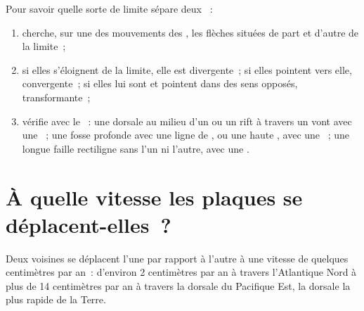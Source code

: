 \begin{method}\label{met:g7:plate-tectonics:recognise}
Pour savoir quelle sorte de limite sépare deux ~:
\begin{enumerate}
  \item cherche, sur une  des mouvements des , les flèches
        situées de part et d'autre de la limite~;
  \item si elles s'éloignent de la limite, elle est divergente~; si elles
        pointent vers elle, convergente~; si elles lui sont  et
        pointent dans des sens opposés, transformante~;
  \item vérifie avec le ~: une dorsale au milieu d'un  ou un
        rift à travers un  vont avec une ~; une
        fosse profonde avec une ligne de , ou une haute , avec une ~; une longue faille
        rectiligne sans l'un ni l'autre, avec une .
\end{enumerate}
\end{method}

\section{À quelle vitesse les plaques se déplacent-elles~?}

\begin{proposition}\label{prop:g7:plate-tectonics:speed}
Deux  voisines se déplacent l'une par rapport à l'autre à une
vitesse de quelques centimètres par an~: d'environ 2 centimètres par an à
travers l'Atlantique Nord à plus de 14 centimètres par an à travers la
dorsale du Pacifique Est, la dorsale la plus rapide de la Terre.
\end{proposition}

